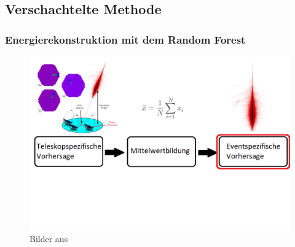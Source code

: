 \documentclass[aspectratio=1610, professionalfonts, 9pt]{beamer}
\begin{document}
  \subsection{Verschachtelte Methode}

  \begin{frame}
    \frametitle{Energierekonstruktion mit dem Random Forest}
    \begin{figure}
      \includegraphics[width=\textwidth]{pictures/Ablauf12.png}
      \caption{Bilder aus~\cite{ablauf}}
      \label{}
    \end{figure}
  \end{frame}
\end{document}
